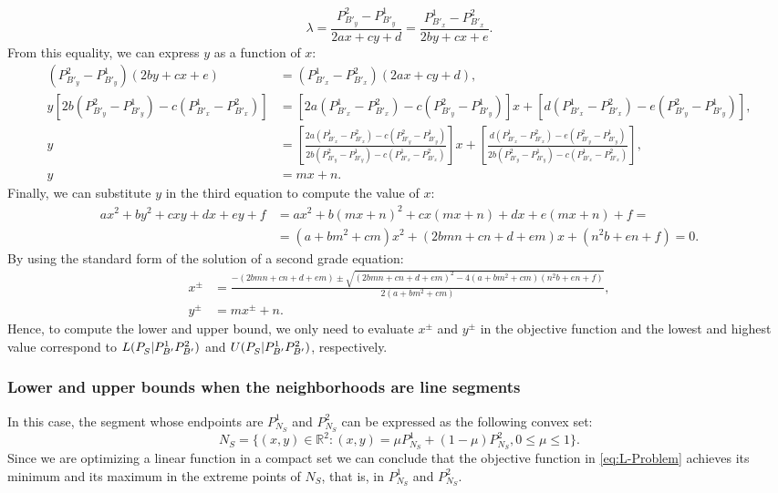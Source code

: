 \documentclass[a4paper]{elsarticle}
\begin{document}
$$\lambda = \frac{P^{2}_{B'_y}-P^{1}_{B'_y}}{2ax+cy+d}=\frac{P^{1}_{B'_x}-P^{2}_{B'_x}}{2by+cx+e}.$$
From this equality, we can express $y$ as a function of $x$:
\begin{align*}
(P^{2}_{B'_y}-P^{1}_{B'_y})(2by+cx+e)&=(P^{1}_{B'_x}-P^{2}_{B'_x})(2ax+cy+d),\\
y\left[2b(P^{2}_{B'_y}-P^{1}_{B'_y})-c(P^{1}_{B'_x}-P^{2}_{B'_x})\right]&=\left[2a(P^{1}_{B'_x}-P^{2}_{B'_x})-c(P^{2}_{B'_y}-P^{1}_{B'_y})\right]x+\left[d(P^{1}_{B'_x}-P^{2}_{B'_x})-e(P^{2}_{B'_y}-P^{1}_{B'_y})\right],\\
y&=\left[\frac{2a(P^{1}_{B'_x}-P^{2}_{B'_x})-c(P^{2}_{B'_y}-P^{1}_{B'_y})}{2b(P^{2}_{B'_y}-P^{1}_{B'_y})-c(P^{1}_{B'_x}-P^{2}_{B'_x})}\right]x+\left[\frac{d(P^{1}_{B'_x}-P^{2}_{B'_x})-e(P^{2}_{B'_y}-P^{1}_{B'_y})}{2b(P^{2}_{B'_y}-P^{1}_{B'_y})-c(P^{1}_{B'_x}-P^{2}_{B'_x})}\right],\\
y&=mx+n.
\end{align*}
Finally, we can substitute $y$ in the third equation to compute the value of $x$:
\begin{align*}
ax^2+by^2+cxy+dx+ey+f &= ax^2+b(mx+n)^2+cx(mx+n)+dx+e(mx+n)+f =\\
&= (a+bm^2+cm)x^2+(2bmn+cn+d+em)x+(n^2b+en+f)=0.
\end{align*}
By using the standard form of the solution of a second grade equation:
\begin{align*}
x^{\pm}&=\frac{-(2bmn+cn+d+em)\pm\sqrt{(2bmn+cn+d+em)^2-4(a+bm^2+cm)(n^2b+en+f)}}{2(a+bm^2+cm)},\\
y^{\pm}&=mx^{\pm}+n.
\end{align*}
Hence, to compute the lower and upper bound, we only need to evaluate $x^{\pm}$ and $y^{\pm}$ in the objective function and the lowest and highest value correspond to $L(P_S^{}|P_{B'}^1P_{B'}^2)$ and $U(P_S^{}|P_{B'}^1P_{B'}^2)$, respectively.

\subsubsection{Lower and upper bounds when the neighborhoods are line segments}
In this case, the segment whose endpoints are $P^1_{N_S}$ and $P^2_{N_S}$ can be expressed as the following convex set:
$$N_S=\{(x,y)\in\mathbb R^2:(x,y)=\mu P^1_{N_S}+(1-\mu)P^2_{N_S}, 0\leq\mu\leq1\}.$$
Since we are optimizing a linear function in a compact set we can conclude that the objective function in \eqref{eq:L-Problem} achieves its minimum and its maximum in the extreme points of $N_S$, that is, in $P^1_{N_S}$ and $P^2_{N_S}$. 
\end{document}
